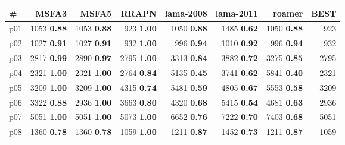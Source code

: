 \begin{tabular}{lrrrrrrr}
\toprule
\textbf{\#} & \textbf{MSFA3} & \textbf{MSFA5} & \textbf{RRAPN} & \textbf{lama-2008} & \textbf{lama-2011} & \textbf{roamer} & \textbf{BEST}\\
\midrule
\multicolumn{1}{l|}{p01} & {\footnotesize 1053} \textbf{0.88} & {\footnotesize 1053} \textbf{0.88} & {\footnotesize 923} \textbf{1.00} & {\footnotesize 1050} \textbf{0.88} & {\footnotesize 1485} \textbf{0.62} & {\footnotesize 1050} \textbf{0.88} & \multicolumn{1}{|r}{923}\\
\multicolumn{1}{l|}{p02} & {\footnotesize 1027} \textbf{0.91} & {\footnotesize 1027} \textbf{0.91} & {\footnotesize 932} \textbf{1.00} & {\footnotesize 996} \textbf{0.94} & {\footnotesize 1010} \textbf{0.92} & {\footnotesize 996} \textbf{0.94} & \multicolumn{1}{|r}{932}\\
\multicolumn{1}{l|}{p03} & {\footnotesize 2817} \textbf{0.99} & {\footnotesize 2890} \textbf{0.97} & {\footnotesize 2795} \textbf{1.00} & {\footnotesize 3313} \textbf{0.84} & {\footnotesize 3882} \textbf{0.72} & {\footnotesize 3275} \textbf{0.85} & \multicolumn{1}{|r}{2795}\\
\multicolumn{1}{l|}{p04} & {\footnotesize 2321} \textbf{1.00} & {\footnotesize 2321} \textbf{1.00} & {\footnotesize 2764} \textbf{0.84} & {\footnotesize 5135} \textbf{0.45} & {\footnotesize 3741} \textbf{0.62} & {\footnotesize 5841} \textbf{0.40} & \multicolumn{1}{|r}{2321}\\
\multicolumn{1}{l|}{p05} & {\footnotesize 3209} \textbf{1.00} & {\footnotesize 3209} \textbf{1.00} & {\footnotesize 4315} \textbf{0.74} & {\footnotesize 5481} \textbf{0.59} & {\footnotesize 4805} \textbf{0.67} & {\footnotesize 5553} \textbf{0.58} & \multicolumn{1}{|r}{3209}\\
\multicolumn{1}{l|}{p06} & {\footnotesize 3322} \textbf{0.88} & {\footnotesize 2936} \textbf{1.00} & {\footnotesize 3663} \textbf{0.80} & {\footnotesize 4320} \textbf{0.68} & {\footnotesize 5415} \textbf{0.54} & {\footnotesize 4681} \textbf{0.63} & \multicolumn{1}{|r}{2936}\\
\multicolumn{1}{l|}{p07} & {\footnotesize 5051} \textbf{1.00} & {\footnotesize 5051} \textbf{1.00} & {\footnotesize 5073} \textbf{1.00} & {\footnotesize 6652} \textbf{0.76} & {\footnotesize 7222} \textbf{0.70} & {\footnotesize 7403} \textbf{0.68} & \multicolumn{1}{|r}{5051}\\
\multicolumn{1}{l|}{p08} & {\footnotesize 1360} \textbf{0.78} & {\footnotesize 1360} \textbf{0.78} & {\footnotesize 1059} \textbf{1.00} & {\footnotesize 1211} \textbf{0.87} & {\footnotesize 1452} \textbf{0.73} & {\footnotesize 1211} \textbf{0.87} & \multicolumn{1}{|r}{1059}\\

\end{tabular}
